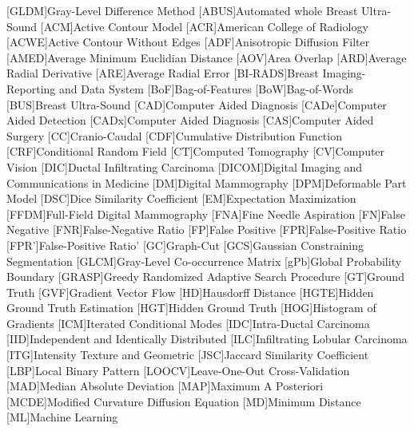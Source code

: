 \begin{acronym}
[GLDM]{Gray-Level Difference Method}
[ABUS]{Automated whole Breast Ultra-Sound}
[ACM]{Active Contour Model}
[ACR]{American College of Radiology}
[ACWE]{Active Contour Without Edges}
[ADF]{Anisotropic Diffusion Filter}
[AMED]{Average Minimum Euclidian Distance}
[AOV]{Area Overlap}
[ARD]{Average Radial Derivative}
[ARE]{Average Radial Error}
[BI-RADS]{Breast Imaging-Reporting and Data System}
[BoF]{Bag-of-Features}
[BoW]{Bag-of-Words}
[BUS]{Breast Ultra-Sound}
[CAD]{Computer Aided Diagnosis}
[CADe]{Computer Aided Detection}
[CADx]{Computer Aided Diagnosis}
[CAS]{Computer Aided Surgery}
[CC]{Cranio-Caudal}
[CDF]{Cumulative Distribution Function}
[CRF]{Conditional Random Field}
[CT]{Computed Tomography}
[CV]{Computer Vision}
[DIC]{Ductal Infiltrating Carcinoma}
[DICOM]{Digital Imaging and Communications in Medicine}
[DM]{Digital Mammography}
[DPM]{Deformable Part Model}
[DSC]{Dice Similarity Coefficient}
[EM]{Expectation Maximization}
[FFDM]{Full-Field Digital Mammography}
[FNA]{Fine Needle Aspiration}
[FN]{False Negative}
[FNR]{False-Negative Ratio}
[FP]{False Positive}
[FPR]{False-Positive Ratio}
[FPR']{False-Positive Ratio'}
[GC]{Graph-Cut}
[GCS]{Gaussian Constraining Segmentation}
[GLCM]{Gray-Level Co-occurrence Matrix}
[gPb]{Global Probability Boundary}
[GRASP]{Greedy Randomized Adaptive Search Procedure}
[GT]{Ground Truth}
[GVF]{Gradient Vector Flow}
[HD]{Hausdorff Distance}
[HGTE]{Hidden Ground Truth Estimation}
[HGT]{Hidden Ground Truth}
[HOG]{Histogram of Gradients}
[ICM]{Iterated Conditional Modes}
[IDC]{Intra-Ductal Carcinoma}
[IID]{Independent and Identically Distributed}
[ILC]{Infiltrating Lobular Carcinoma}
[ITG]{Intensity Texture and Geometric}
[JSC]{Jaccard Similarity Coefficient}
[LBP]{Local Binary Pattern}
[LOOCV]{Leave-One-Out Cross-Validation} 
[MAD]{Median Absolute Deviation}
[MAP]{Maximum A Posteriori}
[MCDE]{Modified Curvature Diffusion Equation}
[MD]{Minimum Distance}
[ML]{Machine Learning}

\end{acronym}
